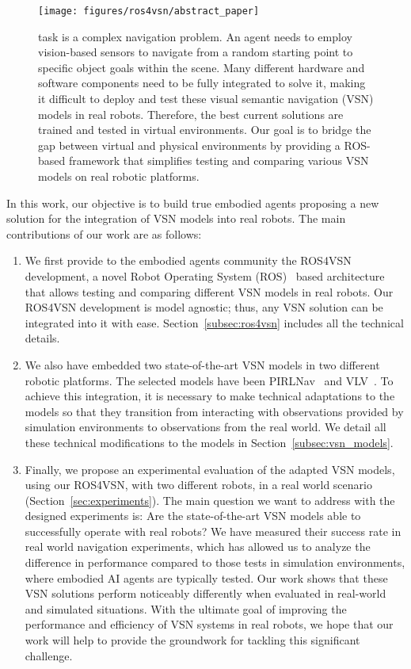 \begin{figure}[t]
    \centering
        \texttt{[image: figures/ros4vsn/abstract\_paper]}
        \caption{
        \objnav task is a complex navigation problem.
        An agent needs to employ vision-based sensors to navigate from a random starting point to specific object goals within the scene.
        Many different hardware and software components need to be fully integrated to solve it, making it difficult to deploy and test these visual semantic navigation (VSN) models in real robots.
        Therefore, the best current solutions are trained and tested in virtual environments.
        Our goal is to bridge the gap between virtual and physical environments by providing a ROS-based framework that simplifies testing and comparing various VSN models on real robotic platforms.
        }
        \label{fig:abstract}
\end{figure}

In this work, our objective is to build true embodied agents proposing a new solution for the integration of VSN models into real robots.
The main contributions of our work are as follows:
\begin{enumerate}
 \item We first provide to the embodied agents community the ROS4VSN development, a novel Robot Operating System (ROS)~\cite{ros} based architecture that allows testing and comparing different VSN models in real robots.
 Our ROS4VSN development is model agnostic; thus, any VSN solution can be integrated into it with ease.
 Section~\ref{subsec:ros4vsn} includes all the technical details.
 \item We also have embedded two state-of-the-art VSN models in two different robotic platforms.
 The selected models have been PIRLNav~\cite{ramrakhya2023} and VLV~\cite{chang2020}.
 To achieve this integration, it is necessary to make technical adaptations to the models so that they transition from interacting with observations provided by simulation environments to observations from the real world.
 We detail all these technical modifications to the models in Section~\ref{subsec:vsn_models}.
 \item Finally, we propose an experimental evaluation of the adapted VSN models, using our ROS4VSN, with two different robots, in a real world scenario (Section~\ref{sec:experiments}).
 The main question we want to address with the designed experiments is: Are the state-of-the-art VSN models able to successfully operate with real robots?
 We have measured their success rate in real world navigation experiments, which has allowed us to analyze the difference in performance compared to those tests in simulation environments, where embodied AI agents are typically tested.
 Our work shows that these VSN solutions perform noticeably differently when evaluated in real-world and simulated situations.
 With the ultimate goal of improving the performance and efficiency of VSN systems in real robots, we hope that our work will help to provide the groundwork for tackling this significant challenge.
\end{enumerate}


